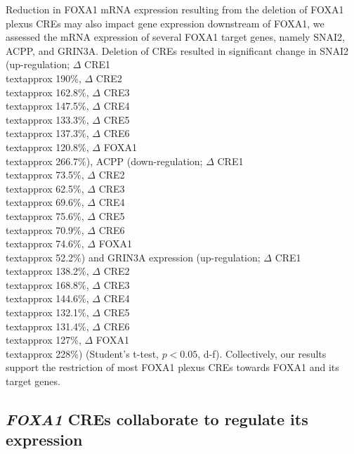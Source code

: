 Reduction in FOXA1 mRNA expression resulting from the deletion of FOXA1 plexus CREs may also impact gene expression downstream of FOXA1, we assessed the mRNA expression of several FOXA1 target genes, namely SNAI2, ACPP, and GRIN3A.
Deletion of CREs resulted in significant change in SNAI2 (up-regulation; $\Delta$ CRE1 \\textapprox 190\%, $\Delta$ CRE2 \\textapprox 162.8\%, $\Delta$ CRE3 \\textapprox 147.5\%, $\Delta$ CRE4 \\textapprox 133.3\%, $\Delta$ CRE5 \\textapprox 137.3\%, $\Delta$ CRE6 \\textapprox 120.8\%, $\Delta$ FOXA1 \\textapprox 266.7\%), ACPP (down-regulation; $\Delta$ CRE1 \\textapprox 73.5\%, $\Delta$ CRE2 \\textapprox 62.5\%, $\Delta$ CRE3 \\textapprox 69.6\%, $\Delta$ CRE4 \\textapprox 75.6\%, $\Delta$ CRE5 \\textapprox 70.9\%, $\Delta$ CRE6 \\textapprox 74.6\%, $\Delta$ FOXA1 \\textapprox 52.2\%) and GRIN3A expression (up-regulation; $\Delta$ CRE1 \\textapprox 138.2\%, $\Delta$ CRE2 \\textapprox 168.8\%, $\Delta$ CRE3 \\textapprox 144.6\%, $\Delta$ CRE4 \\textapprox 132.1\%, $\Delta$ CRE5 \\textapprox 131.4\%, $\Delta$ CRE6 \\textapprox 127\%, $\Delta$ FOXA1 \\textapprox 228\%) (Student's t-test, $p < 0.05$, d-f).
Collectively, our results support the restriction of most FOXA1 plexus CREs towards FOXA1 and its target genes.

\subsection{\emph{FOXA1} CREs collaborate to regulate its expression}

